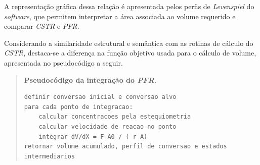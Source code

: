 A representação gráfica dessa relação é apresentada pelos perfis de \textit{Levenspiel} do \textit{software}, que permitem interpretar a área associada ao volume requerido e comparar \textit{CSTR} e \textit{PFR}.

Considerando a similaridade estrutural e semântica com as rotinas de cálculo do \textit{CSTR}, destaca-se a diferença na função objetivo usada para o cálculo de volume, apresentada no pseudocódigo a seguir.

\begin{quote}
\small
\textbf{Pseudocódigo da integração do \textit{PFR}.}
\begin{verbatim}
definir conversao inicial e conversao alvo
para cada ponto de integracao:
    calcular concentracoes pela estequiometria
    calcular velocidade de reacao no ponto
    integrar dV/dX = F_A0 / (-r_A)
retornar volume acumulado, perfil de conversao e estados intermediarios
\end{verbatim}
\end{quote}
